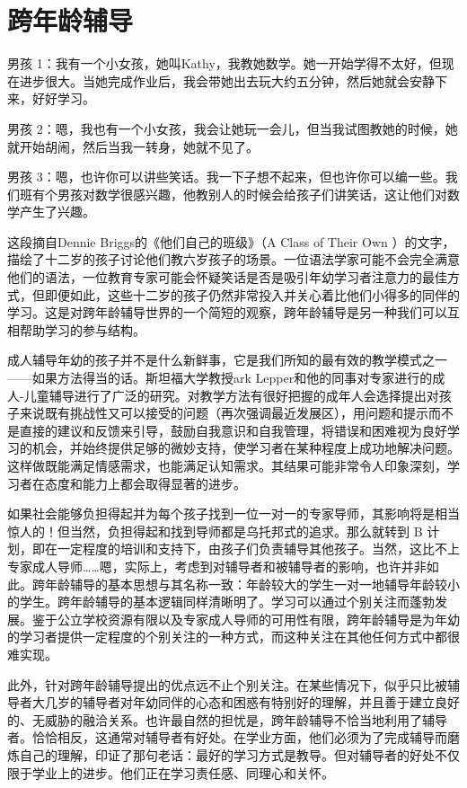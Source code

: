 \section*{跨年龄辅导}

男孩 1：我有一个小女孩，她叫Kathy，我教她数学。她一开始学得不太好，但现在进步很大。当她完成作业后，我会带她出去玩大约五分钟，然后她就会安静下来，好好学习。

男孩 2：嗯，我也有一个小女孩，我会让她玩一会儿，但当我试图教她的时候，她就开始胡闹，然后当我一转身，她就不见了。

男孩 3：嗯，也许你可以讲些笑话。我一下子想不起来，但也许你可以编一些。我们班有个男孩对数学很感兴趣，他教别人的时候会给孩子们讲笑话，这让他们对数学产生了兴趣。

这段摘自Dennie Briggs的《他们自己的班级》（A Class of Their Own ）的文字，描绘了十二岁的孩子讨论他们教六岁孩子的场景。一位语法学家可能不会完全满意他们的语法，一位教育专家可能会怀疑笑话是否是吸引年幼学习者注意力的最佳方式，但即便如此，这些十二岁的孩子仍然非常投入并关心着比他们小得多的同伴的学习。这是对跨年龄辅导世界的一个简短的观察，跨年龄辅导是另一种我们可以互相帮助学习的参与结构。

成人辅导年幼的孩子并不是什么新鲜事，它是我们所知的最有效的教学模式之一——如果方法得当的话。斯坦福大学教授ark Lepper和他的同事对专家进行的成人-儿童辅导进行了广泛的研究。对教学方法有很好把握的成年人会选择提出对孩子来说既有挑战性又可以接受的问题（再次强调最近发展区），用问题和提示而不是直接的建议和反馈来引导，鼓励自我意识和自我管理，将错误和困难视为良好学习的机会，并始终提供足够的微妙支持，使学习者在某种程度上成功地解决问题。这样做既能满足情感需求，也能满足认知需求。其结果可能非常令人印象深刻，学习者在态度和能力上都会取得显著的进步。

如果社会能够负担得起并为每个孩子找到一位一对一的专家导师，其影响将是相当惊人的！但当然，负担得起和找到导师都是乌托邦式的追求。那么就转到 B 计划，即在一定程度的培训和支持下，由孩子们负责辅导其他孩子。当然，这比不上专家成人导师……嗯，实际上，考虑到对辅导者和被辅导者的影响，也许并非如此。跨年龄辅导的基本思想与其名称一致：年龄较大的学生一对一地辅导年龄较小的学生。跨年龄辅导的基本逻辑同样清晰明了。学习可以通过个别关注而蓬勃发展。鉴于公立学校资源有限以及专家成人导师的可用性有限，跨年龄辅导是为年幼的学习者提供一定程度的个别关注的一种方式，而这种关注在其他任何方式中都很难实现。

此外，针对跨年龄辅导提出的优点远不止个别关注。在某些情况下，似乎只比被辅导者大几岁的辅导者对年幼同伴的心态和困惑有特别好的理解，并且善于建立良好的、无威胁的融洽关系。也许最自然的担忧是，跨年龄辅导不恰当地利用了辅导者。恰恰相反，这通常对辅导者有好处。在学业方面，他们必须为了完成辅导而磨炼自己的理解，印证了那句老话：最好的学习方式是教导。但对辅导者的好处不仅限于学业上的进步。他们正在学习责任感、同理心和关怀。


